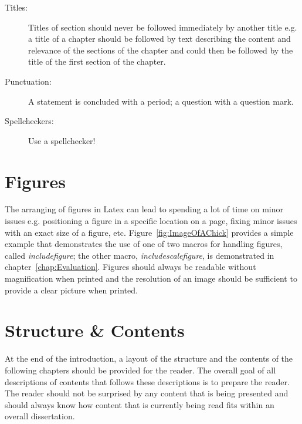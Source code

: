 \begin{description}
	\item [Titles:] Titles of section should never be followed immediately by another title e.g. a title of a chapter should be followed by text describing the content and relevance of the sections of the chapter and could then be followed by the title of the first section of the chapter.
	\item [Punctuation:] A statement is concluded with a period; a question with a question mark.  
	\item [Spellcheckers:] Use a spellchecker!
\end{description}


\section{Figures} 

The arranging of figures in Latex can lead to spending a lot of time on minor issues e.g. positioning a figure in a specific location on a page, fixing minor issues with an exact size of a figure, etc. Figure~\ref{fig:ImageOfAChick} provides a simple example that demonstrates the use of one of two macros for handling figures, called {\it includefigure}; the other macro,  {\it includescalefigure}, is demonstrated in chapter~\ref{chap:Evaluation}. Figures should always be readable without magnification when printed and the resolution of an image should be sufficient to provide a clear picture when printed.



\section{Structure \& Contents}

At the end of the introduction, a layout of the structure and the contents of the following chapters should be provided for the reader. The overall goal of all descriptions of contents that follows these descriptions is to prepare the reader. The reader should not be surprised by any content that is being presented and should always know how content that is currently being read fits within an overall dissertation.